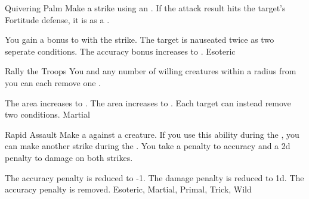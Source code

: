 \lowercase{\hypertarget{maneuver:Quivering Palm}{}}\label{maneuver:Quivering Palm}
\hypertarget{maneuver:Quivering Palm}{}
\begin{apability}{Quivering Palm}
Make a strike using an .
If the attack result hits the target's Fortitude defense,
it is  as a .

\rankline
{} You gain a  bonus to  with the strike.
 The target is nauseated twice as two seperate conditions.
 The accuracy bonus increases to .
 Esoteric
\end{apability}
\vspace{0.25em}



\lowercase{\hypertarget{maneuver:Rally the Troops}{}}\label{maneuver:Rally the Troops}
\hypertarget{maneuver:Rally the Troops}{}
\begin{apability}{Rally the Troops}
You and any number of willing creatures within a \areamed radius from you
can each remove one .

\rankline
{} The area increases to \arealarge.
 The area increases to \areahuge.
 Each target can instead remove two conditions.
 Martial
\end{apability}
\vspace{0.25em}



\lowercase{\hypertarget{maneuver:Rapid Assault}{}}\label{maneuver:Rapid Assault}
\hypertarget{maneuver:Rapid Assault}{}
\begin{apability}{Rapid Assault}
Make a  against a creature.
If you use this ability during the , you can make another strike during the .
You take a  penalty to accuracy and a \minus2d penalty to damage on both strikes.

\rankline
{} The accuracy penalty is reduced to -1.
 The damage penalty is reduced to \minus1d.
 The accuracy penalty is removed.
 Esoteric, Martial, Primal, Trick, Wild
\end{apability}
\vspace{0.25em}



